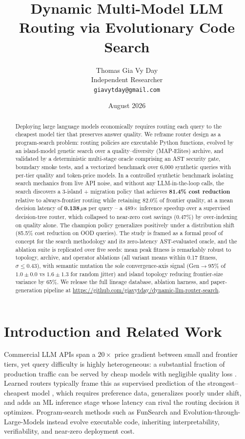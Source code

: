 \documentclass[11pt]{article}
\title{Dynamic Multi-Model LLM Routing via Evolutionary Code Search}
\author{Thomas Gia Vy Day \\ Independent Researcher \\ \texttt{giavytday@gmail.com}}
\date{August 2026}
\begin{document}
\maketitle

\begin{abstract}
Deploying large language models economically requires routing each query to the cheapest model tier that preserves answer quality. We reframe router design as a program-search problem: routing policies are executable Python functions, evolved by an island-model genetic search over a quality--diversity (MAP-Elites) archive, and validated by a deterministic multi-stage oracle comprising an AST security gate, boundary smoke tests, and a vectorized benchmark over 6,000 synthetic queries with per-tier quality and token-price models. In a controlled synthetic benchmark isolating search mechanics from live API noise, and without any LLM-in-the-loop calls, the search discovers a 3-island + migration policy that achieves \textbf{81.4\% cost reduction} relative to always-frontier routing while retaining 82.0\% of frontier quality, at a mean decision latency of \textbf{0.138\,$\mu$s} per query -- a 489$\times$ inference speedup over a supervised decision-tree router, which collapsed to near-zero cost savings (0.47\%) by over-indexing on quality alone. The champion policy generalizes positively under a distribution shift (85.5\% cost reduction on OOD queries). The study is framed as a formal proof of concept for the search methodology and its zero-latency AST-evaluated oracle, and the ablation suite is replicated over five seeds: mean peak fitness is remarkably robust to topology, archive, and operator ablations (all variant means within 0.17 fitness, $\sigma \leq 0.43$), with semantic mutation the sole convergence-axis signal (Gen$\to$95\% of $1.0 \pm 0.0$ vs $1.6 \pm 1.3$ for random jitter) and island topology reducing frontier-size variance by 65\%. We release the full lineage database, ablation harness, and paper-generation pipeline at \url{https://github.com/giavytday/dynamic-llm-router-search}.
\end{abstract}

\section{Introduction and Related Work}
Commercial LLM APIs span a $20\times$ price gradient between small and frontier tiers, yet query difficulty is highly heterogeneous: a substantial fraction of production traffic can be served by cheap models with negligible quality loss \cite{frugalgpt}. Learned routers typically frame this as supervised prediction of the strongest--cheapest model \cite{routellm,ding2024hybrid}, which requires preference data, generalizes poorly under shift, and adds an ML inference stage whose latency can rival the routing decision it optimizes. Program-search methods such as FunSearch \cite{funsearch} and Evolution-through-Large-Models \cite{elm} instead evolve executable code, inheriting interpretability, verifiability, and near-zero deployment cost.
\end{document}

